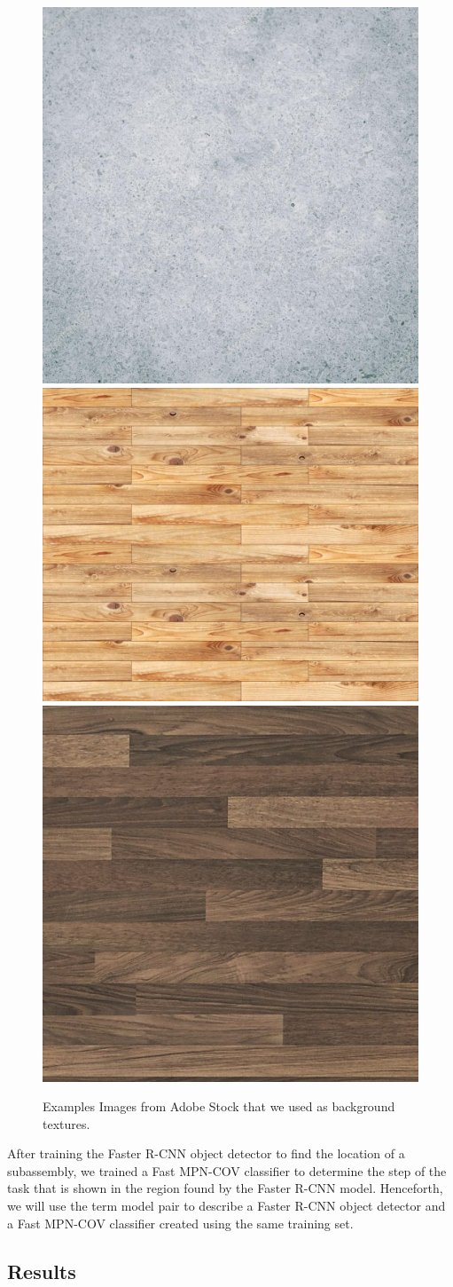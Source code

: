 \begin{figure}
  \includegraphics[width=0.33\columnwidth]{figures/adobe_stock/concrete.jpg}
  \includegraphics[width=0.33\columnwidth]{figures/adobe_stock/wood1.jpg}
  \includegraphics[width=0.33\columnwidth]{figures/adobe_stock/wood2.jpg}
  \caption{
    Examples Images from Adobe Stock that we used as background textures.
  }\label{fig:adobe_backgrounds}
\end{figure}

After training the Faster R-CNN object detector to find the location of a
subassembly, we trained a Fast MPN-COV classifier to determine the step of the
task that is shown in the region found by the Faster R-CNN model.
Henceforth, we will use the term model pair to describe a Faster R-CNN object
detector and a Fast MPN-COV classifier created using the same training set.

\subsection{Results}


